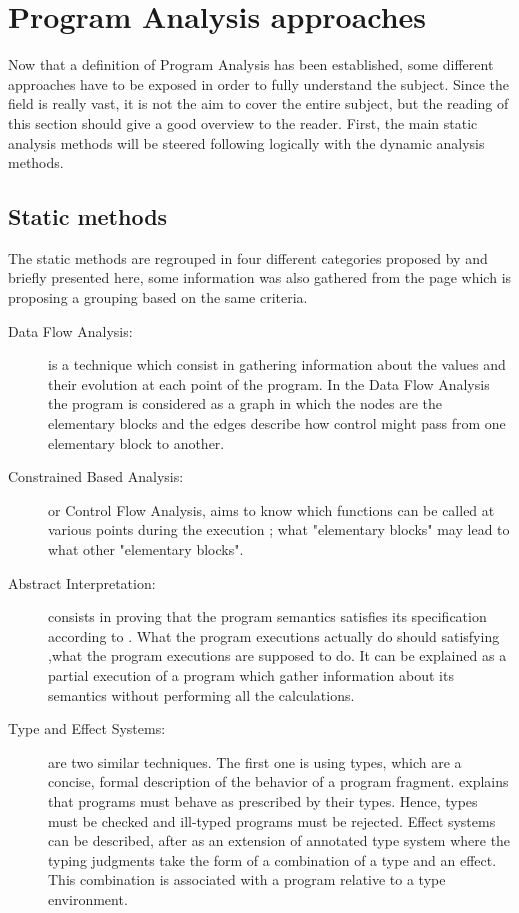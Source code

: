 \pagebreak

\section{Program Analysis approaches}
Now that a definition of Program Analysis has been established, some different approaches have to be exposed in order to fully understand the subject. Since the field is really vast, it is not the aim to cover the entire subject, but the reading of this section should give a good overview to the reader. First, the main static analysis methods will be steered following logically with the dynamic analysis methods.

\subsection{Static methods}

The static methods are regrouped in four different categories proposed by \cite{Nielson2004} and briefly presented here, some information was also gathered from the \cite{Wikipedi2016} page which is proposing a grouping based on the same criteria.

\begin{description}
  \item[Data Flow Analysis:] is a technique which consist in gathering information about the values and their evolution at each point of the program. In the Data Flow Analysis the program is considered as a graph in which the nodes are the elementary blocks and the edges describe how control might pass from one elementary block to another.
  
  \item[Constrained Based Analysis:] or Control Flow Analysis, aims to know which functions can be called at various points during the execution ; what "elementary blocks" may lead to what other "elementary blocks".
  
  \item[Abstract Interpretation:] consists in proving that the program semantics satisfies its specification according to \cite{Cousot2008}. What the program executions actually do should satisfying ,what the program executions are supposed to do. It can be explained as a partial execution of a program which gather information about its semantics without performing all the calculations.
  
  \item[Type and Effect Systems:] are two similar techniques. The first one is using types, which are a concise, formal description of the behavior of a program fragment. \cite{Remy2017} explains that programs must behave as prescribed by their types. Hence, types must be checked and ill-typed programs must be rejected. Effect systems can be described, after \cite{Nielson1999} as an extension of annotated type system where the typing judgments take the form of a combination of a type and an effect. This combination is associated with a program relative to a type environment.
\end{description}


